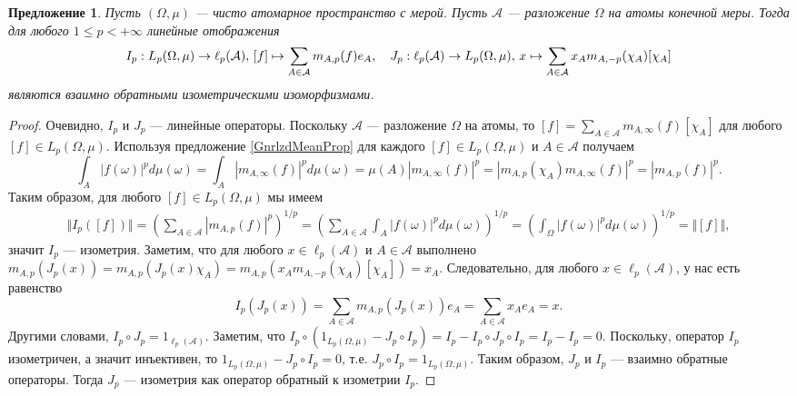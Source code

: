 \documentclass[12pt]{article}
\newtheorem{proposition}[theorem]{Предложение}
\begin{document}
\begin{proposition}\label{LpOnPurAtomMeasSpRepr}
    Пусть $(\Omega,\mu)$ --- чисто атомарное пространство с мерой. 
    Пусть $\mathcal{A}$ --- разложение $\Omega$ на атомы конечной меры. Тогда 
    для любого $1\leq p<+\infty$ линейные отображения
    \[
        I_p:
        L_p(\Omega,\mu)\to \ell_p(\mathcal{A}),\,
        [f]\mapsto\sum_{A\in\mathcal{A}} m_{A,p}(f) e_A,
        \quad
        J_p:
        \ell_p(\mathcal{A})\to L_p(\Omega,\mu),\,
        x\mapsto\sum_{A\in\mathcal{A}} x_A m_{A,-p}(\chi_A) [\chi_A]\\
    \]
    являются взаимно обратными изометрическими изоморфизмами.
\end{proposition}
\begin{proof} 
    Очевидно, $I_p$ и $J_p$ --- линейные операторы. Поскольку $\mathcal{A}$ --- 
    разложение $\Omega$ на атомы, то
    $
        [f]=\sum_{A\in\mathcal{A}} m_{A,\infty}(f)[\chi_A]
    $
    для любого $[f]\in L_p(\Omega,\mu)$. Используя 
    предложение \ref{GnrlzdMeanProp} для 
    каждого $[f]\in L_p(\Omega,\mu)$ и $A\in\mathcal{A}$ получаем
    \[
        \int_A |f(\omega)|^pd\mu(\omega)
        =\int_A\left|m_{A,\infty}(f)\right|^pd\mu(\omega)
        =\mu(A)\left|m_{A,\infty}(f)\right|^p
        =\left|m_{A,p}(\chi_A) m_{A,\infty}(f)\right|^p
        =|m_{A,p}(f)|^p.
    \]
    Таким образом, для любого $[f]\in L_p(\Omega,\mu)$ мы имеем
    \[
    \begin{aligned}
        \Vert I_p([f])\Vert
        =\left( \sum_{A\in\mathcal{A}} |m_{A,p}(f)|^p\right)^{1/p} 
        =\left( 
            \sum_{A\in\mathcal{A}} \int_A |f(\omega)|^pd\mu(\omega)
        \right)^{1/p} 
        =\left( \int_{\Omega} |f(\omega)|^pd\mu(\omega)\right)^{1/p} 
        =\Vert [f]\Vert,
    \end{aligned}
    \]
    значит $I_p$ --- изометрия. Заметим, что для 
    любого $x\in\ell_p(\mathcal{A})$ и $A\in\mathcal{A}$ выполнено
    $
        m_{A,p}(J_p(x))
        =m_{A,p}(J_p(x)\chi_A)
        =m_{A,p}(x_A m_{A,-p}(\chi_A)[\chi_A])
        =x_A.
    $
    Следовательно, для любого $x\in\ell_p(\mathcal{A})$, у нас есть равенство
    \[
        I_p(J_p(x))
        =\sum_{A\in\mathcal{A}}m_{A,p}(J_p(x))e_A
        =\sum_{A\in\mathcal{A}}x_A e_A
        =x.
    \]
    Другими словами, $I_p\circ J_p=1_{\ell_p(\mathcal{A})}$. 
    Заметим, что
    $
        I_p\circ(1_{L_p(\Omega,\mu)}-J_p\circ I_p)
        =I_p-I_p\circ J_p\circ I_p
        =I_p-I_p
        =0
    $. 
    Поскольку, оператор $I_p$ изометричен, а значит инъективен, 
    то $1_{L_p(\Omega,\mu)}-J_p\circ I_p=0$, 
    т.е. $J_p\circ I_p=1_{L_p(\Omega,\mu)}$. Таким образом, $J_p$ и $I_p$ ---
    взаимно обратные операторы. Тогда $J_p$ --- изометрия как оператор обратный
    к изометрии $I_p$.
\end{proof}
\end{document}
